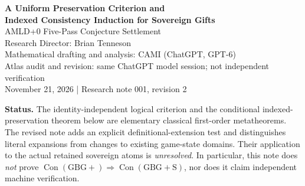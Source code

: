 \documentclass[11pt,letterpaper]{article}
\theoremstyle{definition}
\newcommand{\Con}{\operatorname{Con}}
\newcommand{\Gb}{\mathrm{GBG+}}
\newcommand{\GG}{\mathrm{GBG+S}}
\begin{document}
\begin{center}
{\Large\bfseries\color{navy} A Uniform Preservation Criterion and\\[3pt] Indexed Consistency Induction for Sovereign Gifts}\\[10pt]
{\normalsize AMLD+0 Five-Pass Conjecture Settlement}\\[7pt]
{\small Research Director: Brian Tenneson}\\[2pt]
{\small Mathematical drafting and analysis: CAMI (ChatGPT, GPT-6)}\\[2pt]
{\small Atlas audit and revision: same ChatGPT model session; not independent verification}\\[2pt]
{\small November 21, 2026 \quad | \quad Research note 001, revision 2}
\end{center}
\vspace{0.3em}
\begin{tcolorbox}[colback=gray!6,colframe=gray!45,boxrule=0.4pt,arc=1mm]
\small\textbf{Status.} The identity-independent logical criterion and the conditional indexed-preservation theorem below are elementary classical first-order metatheorems. The revised note adds an explicit definitional-extension test and distinguishes literal expansions from changes to existing game-state domains. Their application to the actual retained sovereign atoms is \emph{unresolved}. In particular, this note does \emph{not} prove \(\Con(\Gb)\Rightarrow\Con(\GG)\), nor does it claim independent machine verification.
\end{tcolorbox}

\begin{abstract}
We investigate two related conjectures: (a) whether consistency-preserving extension can be characterized without reference to the name of an operation, and (b) whether an indexed family of sovereign gifts, beginning with MOBILITY and GRANT, can be proved cumulatively consistent relative to GBG+ by induction. We restate and prove exact semantic and finite-obstruction criteria for a specified first-order extension; give a concrete class of definitional extensions; prove a stronger, compositional model-expansion theorem suitable for induction; and show that compatible extension witnesses yield consistency of every finite prefix, and, by compactness, their union. We also give a sharp counterexample: separately consistent atoms may have an inconsistent union. The retained sovereign atoms have not all been shown to satisfy the extension hypotheses. These are general metatheorems and conditional research tools, not a settlement of unrestricted GBG+S relative consistency; no novelty over established model-theoretic principles is claimed.
\end{abstract}
\end{document}
